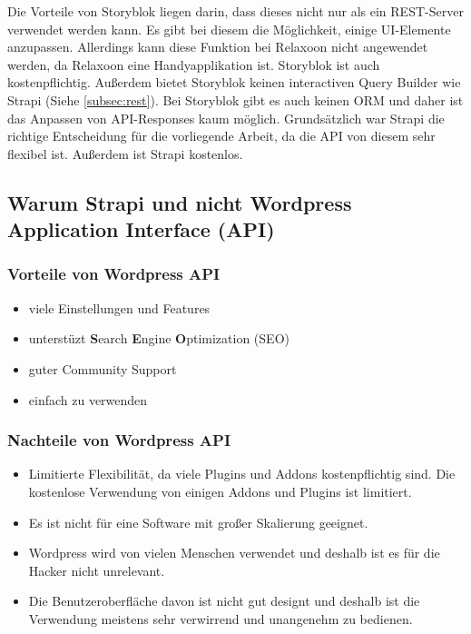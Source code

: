 Die Vorteile von Storyblok liegen darin, dass dieses nicht nur als ein REST-Server verwendet werden kann. Es gibt bei diesem die Möglichkeit, einige UI-Elemente anzupassen. Allerdings kann diese Funktion bei Relaxoon nicht angewendet werden, da Relaxoon eine Handyapplikation ist.
Storyblok ist auch kostenpflichtig. Außerdem bietet Storyblok keinen interactiven Query Builder wie Strapi (Siehe \ref*{subsec:rest}). Bei Storyblok gibt es auch keinen ORM und daher ist das Anpassen von API-Responses kaum möglich. \cite{storyblok-bad}
Grundsätzlich war Strapi die richtige Entscheidung für die vorliegende Arbeit, da die API von diesem sehr flexibel ist. Außerdem ist Strapi kostenlos.


\subsection{Warum Strapi und nicht Wordpress \textbf{Ap}plication \textbf{I}nterface (API)}



\subsubsection{Vorteile von Wordpress API}

\begin{itemize}
    \item viele Einstellungen und Features
    \item unterstüzt \textbf{S}earch \textbf{E}ngine \textbf{O}ptimization (SEO)
    \item guter Community Support
    \item einfach zu verwenden
\end{itemize}
\cite{strapi-vs-wordpress}

\subsubsection{Nachteile von Wordpress API}
\begin{itemize}
    \item  Limitierte Flexibilität, da viele Plugins und Addons kostenpflichtig sind.
          Die kostenlose Verwendung von einigen Addons und Plugins ist limitiert.
    \item Es ist nicht für eine Software mit großer Skalierung geeignet.
    \item Wordpress wird von vielen Menschen verwendet und deshalb ist es für die Hacker nicht unrelevant.
    \item Die Benutzeroberfläche davon ist nicht gut designt und deshalb ist die Verwendung meistens sehr verwirrend und unangenehm zu bedienen.
\end{itemize}
\cite{strapi-vs-wordpress}

